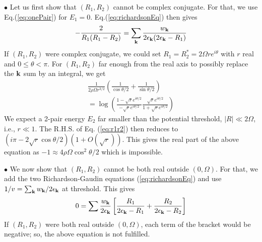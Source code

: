 \documentclass[5p,twocolumn]{elsarticle}
\begin{document}
$\bullet$ Let us first show that $(R_1,R_2)$ cannot be complex conjugate. For that, we use Eq.(\ref{eq:onePair}) for $E_1=0$. Eq.(\ref{eq:richardsonEq}) then gives
\begin{equation}
-\frac{2}{R_{1}(R_{1}-R_{2})}=\sum_{\mathbf{k}}\frac{w_{\mathbf{k}}}{2\epsilon_{\mathbf{k}}(2\epsilon_{\mathbf{k}}-R_{1})}
\end{equation}
If $(R_1,R_2)$ were complex conjugate, we could set $R_1=R^*_2=2 \Omega r e^{i\theta}$ with $r$ real and $0\leqslant\theta<\pi$. For $(R_1,R_2)$ far enough from the real axis to possibly replace the $\mathbf{k}$ sum by an integral, we get
\begin{multline}\label{eq:r1r2}
\frac{1}{2\rho\Omega{r^{3/2}}}\left(\frac{1}{\cos\theta/2}+\frac{1}{\sin\theta/2}\right)\\
=\log\left(\frac{1-\sqrt{r}e^{i\theta/2}}{-\sqrt{r}e^{i\theta/2}}\frac{\sqrt{r}e^{i\theta/2}}{1+\sqrt{r}e^{i\theta/2}}\right)
\end{multline}
We expect a 2-pair energy $E_{2}$ far smaller than the potential threshold,  $|R|\ll2 \Omega$, i.e., $r\ll1$. The R.H.S. of Eq. (\ref{eq:r1r2}) then reduces to 
$(i\pi-2\sqrt r\cos\theta/2)(1+O(\sqrt r))$. This gives the real part of the above equation as $-1\approx4 \rho \Omega\cos^2\theta/2$ which is impossible.


$\bullet$ We now show that $(R_1,R_2)$ cannot be both real outside $(0,\Omega)$. For that, we add the two Richardson-Gaudin equations (\ref{eq:richardsonEq}) and use $1/v=\sum_{\mathbf{k}}w_{\mathbf{k}}/2\epsilon_{\mathbf{k}}$ at threshold. This gives
\begin{equation}
0=\sum\frac{w_{\mathbf{k}}}{2\epsilon_{\mathbf{k}}}\left[\frac{R_{1}}{2\epsilon_{\mathbf{k}}-R_{1}}+\frac{R_{2}}{2\epsilon_{\mathbf{k}}-R_{2}}\right]
\end{equation}
If $(R_1,R_2)$ were both real outside $(0,\Omega)$, each term of the bracket would be negative; so, the above equation is not fulfilled.
\end{document}
